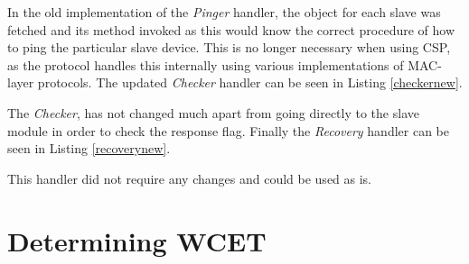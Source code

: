 

In the old implementation of the \textit{Pinger} handler, the  object for each slave was fetched and its  method invoked as this would know the correct procedure of how to ping the particular slave device. This is no longer necessary when using CSP, as the protocol handles this internally using various implementations of MAC-layer protocols. The updated \textit{Checker} handler can be seen in Listing \ref{checkernew}.



The \textit{Checker}, has not changed much apart from going directly to the slave module in order to check the response flag. Finally the \textit{Recovery} handler can be seen in Listing \ref{recoverynew}.



This handler did not require any changes and could be used as is.

\section{Determining WCET}

